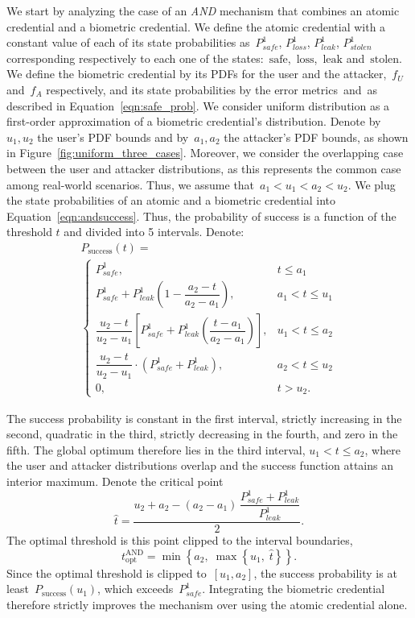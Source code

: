 \documentclass[conference,compsoc]{IEEEtran}
\begin{document}
We start by analyzing the case of an \emph{AND} mechanism that combines an atomic credential and a biometric credential. 
We define the atomic credential with a constant value of each of its state probabilities as~$P^1_{safe}$, $P^1_{loss}$, $P^1_{leak}$, $P^1_{stolen}$ corresponding respectively to each one of the states:~${\text{safe}}$,~${\text{loss}}$,~${\text{leak}}$ and~${\text{stolen}}$. 
We define the biometric credential by its PDFs for the user and the attacker,~$f_U$ and~$f_A$ respectively, and its state probabilities by the error metrics~\FAR and~\FRR as described in Equation~\ref{eqn:safe_prob}. We consider uniform distribution as a first-order approximation of a biometric credential's distribution. Denote by~$u_1, u_2$ the user's PDF bounds and by~$a_1, a_2$ the attacker's PDF bounds, as shown in Figure~\ref{fig:uniform_three_cases}. Moreover, we consider the overlapping case between the user and attacker distributions, as this represents the common case among real-world scenarios. Thus, we assume that~$a_1 < u_1 < a_2 < u_2$.
We plug the state probabilities of an atomic and a biometric credential into Equation~\ref{eqn:andsuccess}. Thus, the probability of success is a function of the threshold $t$ and divided into 5 intervals. Denote:
\begin{multline*}
P_{\mathrm{success}}(t)=\\
\begin{cases}
P^1_{safe}, 
& t \le a_1 \\
P^1_{safe} + P^1_{leak}\left(1-\dfrac{a_2 - t}{a_2 - a_1}\right), 
& a_1 < t \le u_1 \\
\dfrac{u_2 - t}{u_2 - u_1}\left[P^1_{safe} + P^1_{leak}\left(\dfrac{t - a_1}{a_2 - a_1}\right)\right],
& u_1 < t \le a_2 \\
\dfrac{u_2 - t}{u_2 - u_1}\cdot(P^1_{safe} + P^1_{leak}),
& a_2 < t \le u_2 \\
0, 
& t > u_2 .
\end{cases}
\end{multline*}

The success probability is constant in the first interval, strictly increasing in the second, quadratic in the third, strictly decreasing in the fourth, and zero in the fifth.
The global optimum therefore lies in the third interval, $u_1 < t \le a_2$, where the user and attacker distributions overlap and the success function attains an interior maximum. Denote the critical point
\begin{equation*}
\hat{t}
=
\frac{
u_2 + a_2
- (a_2 - a_1)\,\dfrac{P^1_{safe} + P^1_{leak}}{P^1_{leak}}
}{2}.
\end{equation*}
The optimal threshold is this point clipped to the interval boundaries,
\begin{equation*}
t_{\text{opt}}^{\mathrm{AND}} = \min\left\{a_2,\;\max\left\{u_1,\;\hat{t}\right\}\right\}.
\end{equation*}
Since the optimal threshold is clipped to~$[u_1, a_2]$, the success probability is at least~$P_{\text{success}}(u_1)$, which exceeds~$P^1_{safe}$. Integrating the biometric credential therefore strictly improves the mechanism over using the atomic credential alone.
\end{document}
